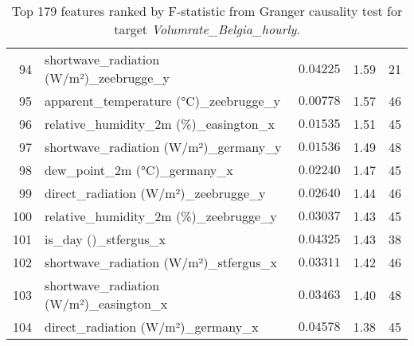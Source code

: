 \begin{table}[H]
\begin{tabular}{r l l l l}
        94 & shortwave\_radiation (W/m²)\_zeebrugge\_y & $0.04225$ & 1.59 & 21 \\
        95 & apparent\_temperature (°C)\_zeebrugge\_y & $0.00778$ & 1.57 & 46 \\
        96 & relative\_humidity\_2m (\%)\_easington\_x & $0.01535$ & 1.51 & 45 \\
        97 & shortwave\_radiation (W/m²)\_germany\_y & $0.01536$ & 1.49 & 48 \\
        98 & dew\_point\_2m (°C)\_germany\_x & $0.02240$ & 1.47 & 45 \\
        99 & direct\_radiation (W/m²)\_zeebrugge\_y & $0.02640$ & 1.44 & 46 \\
        100 & relative\_humidity\_2m (\%)\_zeebrugge\_y & $0.03037$ & 1.43 & 45 \\
        101 & is\_day ()\_stfergus\_x & $0.04325$ & 1.43 & 38 \\
        102 & shortwave\_radiation (W/m²)\_stfergus\_x & $0.03311$ & 1.42 & 46 \\
        103 & shortwave\_radiation (W/m²)\_easington\_x & $0.03463$ & 1.40 & 48 \\
        104 & direct\_radiation (W/m²)\_germany\_x & $0.04578$ & 1.38 & 45 \\
        \hline
    \end{tabular}
    \caption{Top 179 features ranked by F-statistic from Granger causality test for target \textit{Volumrate\_Belgia\_hourly}.}
    \label{tab:granger_Belgia_fstat}
\end{table}